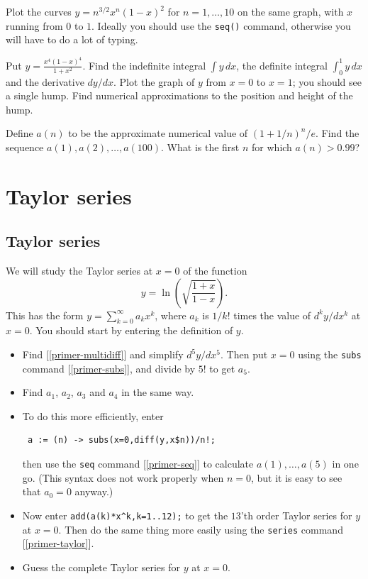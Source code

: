 \documentclass[a4paper,10pt]{amsbook}
\begin{document}
\begin{exercise}
 Plot the curves $y=n^{3/2}x^n(1-x)^2$ for $n=1,\dotsc,10$ on the same
 graph, with $x$ running from $0$ to $1$.  Ideally you should use the
 \verb~seq()~ command, otherwise you will have to do a lot of typing.
\end{exercise}

\begin{exercise}
 Put $\displaystyle y=\frac{x^4(1-x)^4}{1+x^2}$.  Find the
 indefinite integral $\int y\,dx$, the definite integral
 $\int_0^1 y\,dx$ and the derivative $dy/dx$.  Plot the
 graph of $y$ from $x=0$ to $x=1$; you should see a single
 hump.  Find numerical approximations to the position and
 height of the hump.
\end{exercise}

\begin{exercise}
 Define $a(n)$ to be the approximate numerical value of
 $(1+1/n)^n/e$.  Find the sequence
 $a(1),a(2),\dotsc,a(100)$.  What is the first $n$ for which
 $a(n)>0.99$? 
\end{exercise}

\chapter{Taylor series}

\section{Taylor series}\label{sec-taylor}

\begin{exercise}\label{ex-ln}
 We will study the Taylor series at $x=0$ of the function 
 \[ y = \ln\left(\sqrt{\frac{1+x}{1-x}}\right).  \]
 This has the form $y=\sum_{k=0}^\infty a_kx^k$, where $a_k$
 is $1/k!$ times the value of $d^ky/dx^k$ at $x=0$.  You
 should start by entering the definition of $y$.
 \begin{itemize}
  \item[(a)] Find [\ref{primer-multidiff}] and simplify
   $d^5y/dx^5$.  Then put $x=0$ using the \verb~subs~
   command [\ref{primer-subs}], and divide by $5!$ to get $a_5$.
  \item[(b)] Find $a_1$, $a_2$, $a_3$ and $a_4$ in the
   same way.
  \item[(c)] To do this more efficiently, enter 
\begin{verbatim}
 a := (n) -> subs(x=0,diff(y,x$n))/n!;
\end{verbatim}
   then use the \verb~seq~ command [\ref{primer-seq}] to
   calculate $a(1),\dotsc,a(5)$ in one go.  (This syntax does not
   work properly when $n=0$, but it is easy to see that
   $a_0=0$ anyway.)
  \item[(d)] Now enter \verb~add(a(k)*x^k,k=1..12);~ to get
   the $13$'th order Taylor series for $y$ at $x=0$.  Then do the
   same thing more easily using the \verb~series~ command
   [\ref{primer-taylor}]. 
  \item[(e)] Guess the complete Taylor series for $y$ at $x=0$.
 \end{itemize}
\end{exercise}
\end{document}
